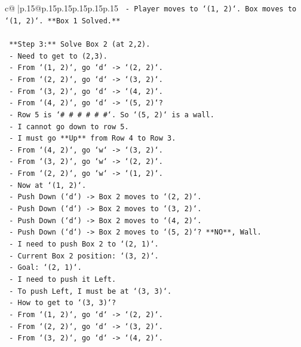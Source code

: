 \documentclass{article}
\begin{document}
{\begin{supertabular}{c@{$\;$}|p{.15\linewidth}@{}p{.15\linewidth}p{.15\linewidth}p{.15\linewidth}p{.15\linewidth}p{.15\linewidth}}
{{{\texttt{    {-} Player moves to `(1, 2)`. Box moves to `(1, 2)`. **Box 1 Solved.**} \\
\\ 
\texttt{    **Step 3:** Solve Box 2 (at 2,2).} \\
\texttt{    {-} Need to get to (2,3).} \\
\texttt{    {-} From `(1, 2)`, go `d` {-}> `(2, 2)`.} \\
\texttt{    {-} From `(2, 2)`, go `d` {-}> `(3, 2)`.} \\
\texttt{    {-} From `(3, 2)`, go `d` {-}> `(4, 2)`.} \\
\texttt{    {-} From `(4, 2)`, go `d` {-}> `(5, 2)`?} \\
\texttt{    {-} Row 5 is `\# \# \# \# \# \#`. So `(5, 2)` is a wall.} \\
\texttt{    {-} I cannot go down to row 5.} \\
\texttt{    {-} I must go **Up** from Row 4 to Row 3.} \\
\texttt{    {-} From `(4, 2)`, go `w` {-}> `(3, 2)`.} \\
\texttt{    {-} From `(3, 2)`, go `w` {-}> `(2, 2)`.} \\
\texttt{    {-} From `(2, 2)`, go `w` {-}> `(1, 2)`.} \\
\texttt{    {-} Now at `(1, 2)`.} \\
\texttt{    {-} Push Down (`d`) {-}> Box 2 moves to `(2, 2)`.} \\
\texttt{    {-} Push Down (`d`) {-}> Box 2 moves to `(3, 2)`.} \\
\texttt{    {-} Push Down (`d`) {-}> Box 2 moves to `(4, 2)`.} \\
\texttt{    {-} Push Down (`d`) {-}> Box 2 moves to `(5, 2)`? **NO**, Wall.} \\
\texttt{    {-} I need to push Box 2 to `(2, 1)`.} \\
\texttt{    {-} Current Box 2 position: `(3, 2)`.} \\
\texttt{    {-} Goal: `(2, 1)`.} \\
\texttt{    {-} I need to push it Left.} \\
\texttt{    {-} To push Left, I must be at `(3, 3)`.} \\
\texttt{    {-} How to get to `(3, 3)`?} \\
\texttt{    {-} From `(1, 2)`, go `d` {-}> `(2, 2)`.} \\
\texttt{    {-} From `(2, 2)`, go `d` {-}> `(3, 2)`.} \\
\texttt{    {-} From `(3, 2)`, go `d` {-}> `(4, 2)`.} \\
}}}
\end{supertabular}}
\end{document}
